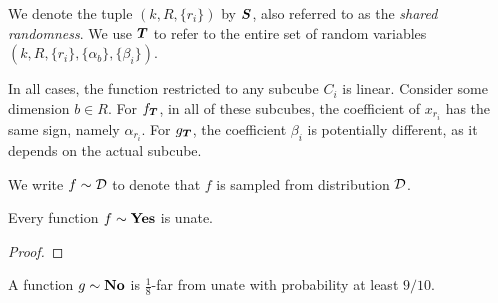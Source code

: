 \noindent We denote the tuple $(k,R,\{r_i\})$ by $\boldsymbol{S}$, also referred
to as the \emph{shared randomness}. We use $\boldsymbol{T}$ to refer
to the entire set of random variables $(k, R, \{r_i\}, \{\alpha_b\}, \{\beta_i\})$.

In all cases, the function restricted to any subcube $C_i$ is linear.
Consider some dimension $b \in R$. 
For $f_{\boldsymbol{T}}$, in all of these subcubes,
the coefficient of $x_{r_i}$ has the same sign, namely $\alpha_{r_i}$. %
For $g_{\boldsymbol{T}}$, the coefficient $\beta_i$ is potentially different,
as it depends on the actual subcube.

\noindent We write $f \sim \mathcal{D}$ to denote that $f$ is sampled from distribution $\mathcal{D}$.

\begin{claim}\label{clm:yes}
Every function $f \sim \mathbf{Yes}$ is unate.
\end{claim}

\begin{proof}
\end{proof}

\begin{claim}\label{clm:no}
A function $g \sim \mathbf {No}$ is $\frac{1}{8}$-far from unate with probability at least $ 9/10$.
\end{claim}

